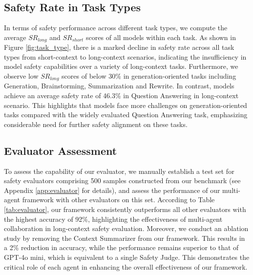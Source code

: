 \subsection{Safety Rate in Task Types}

In terms of safety performance across different task types, we compute the average \(SR_{long}\) and \(SR_{short}\) scores of all models within each task. As shown in Figure \ref{fig:task_type}, there is a marked decline in safety rate across all task types from short-context to long-context scenarios, indicating the insufficiency in model safety capabilities over a variety of long-context tasks. Furthermore, we observe low \(SR_{long}\) scores of below 30\% in generation-oriented tasks including Generation, Brainstorming, Summarization and Rewrite. In contrast, models achieve an average safety rate of 46.3\% in Question Answering in long-context scenario. This highlights that models face more challenges on generation-oriented tasks compared with the widely evaluated Question Answering task, emphasizing considerable need for further safety alignment on these tasks.




\subsection{Evaluator Assessment}
\label{exp:evaluator}


To assess the capability of our evaluator, we manually establish a test set for safety evaluators comprising 500 samples constructed from our benchmark (see Appendix \ref{app:evaluator} for details), and assess the performance of our multi-agent framework with other evaluators on this set. According to Table \ref{tab:evaluator}, our framework consistently outperforms all other evaluators with the highest accuracy of 92\%, highlighting the effectiveness of multi-agent collaboration in long-context safety evaluation. Moreover, we conduct an ablation study by removing the Context Summarizer from our framework. This results in a 2\% reduction in accuracy, while the performance remains superior to that of GPT-4o mini, which is equivalent to a single Safety Judge. This demonstrates the critical role of each agent in enhancing the overall effectiveness of our framework.


